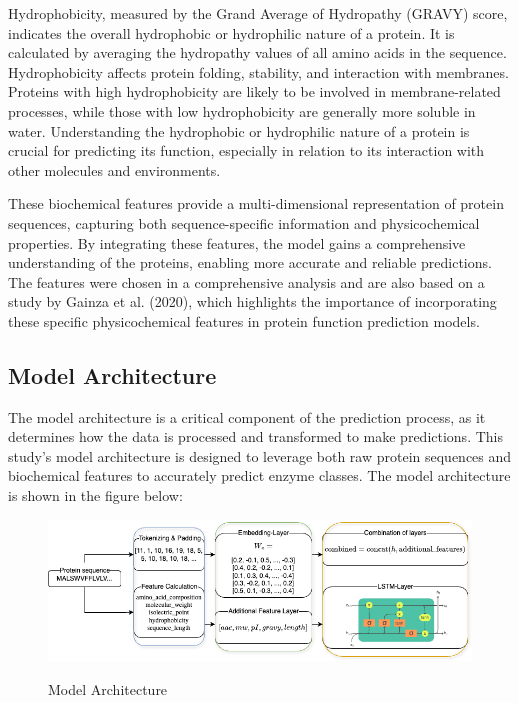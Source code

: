 Hydrophobicity, measured by the Grand Average of Hydropathy (GRAVY) score, indicates the overall hydrophobic or hydrophilic nature of a protein. It is calculated by averaging the hydropathy values of all amino acids in the sequence. Hydrophobicity affects protein folding, stability, and interaction with membranes. Proteins with high hydrophobicity are likely to be involved in membrane-related processes, while those with low hydrophobicity are generally more soluble in water. Understanding the hydrophobic or hydrophilic nature of a protein is crucial for predicting its function, especially in relation to its interaction with other molecules and environments. \autocite{khosraviIdentificationCharacterizationInulinases2023}

These biochemical features provide a multi-dimensional representation of protein sequences, capturing both sequence-specific information and physicochemical properties. By integrating these features, the model gains a comprehensive understanding of the proteins, enabling more accurate and reliable predictions. The features were chosen in a comprehensive analysis and are also based on a study by Gainza et al. (2020), which highlights the importance of incorporating these specific physicochemical features in protein function prediction models. \autocite{gainzaDecipheringInteractionFingerprints2020}

\pagebreak
\subsection{Model Architecture}
\label{sec:Model Architecture}

The model architecture is a critical component of the prediction process, as it determines how the data is processed and transformed to make predictions. This study's model architecture is designed to leverage both raw protein sequences and biochemical features to accurately predict enzyme classes. The model architecture is shown in the figure below:

\begin{figure}[hbt]
    \centering
    \begin{minipage}[t]{\textwidth}
    \caption{Model Architecture}
    \includegraphics[width=1\textwidth]{img/Model-Architecture.drawio.png}
    \label{fig:model-architecture}
    \end{minipage}
\end{figure}

